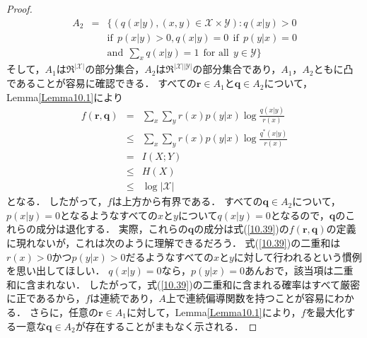 \documentclass{ltjsarticle}
\theoremstyle{definition}
\begin{document}
\begin{proof}
\begin{eqnarray}
    A_2 &=& \{ \left( q(x|y), (x,y) \in \mathcal{X} \times \mathcal{Y} \right) : q(x|y) > 0 \nonumber \\
    && \mbox{if} \ \  p(x|y) > 0, q(x|y) = 0 \ \ \mbox{if} \ \ p(y|x) = 0 \nonumber \\
    && \mbox{and} \ \ \sum_{x} q(x|y) = 1 \ \ \mbox{for all} \ \ y \in \mathcal{Y} \}
  \end{eqnarray}
  そして，$A_1$は$\mathfrak{R}^{| \mathcal{X} |}$の部分集合，$A_2$は$\mathfrak{R}^{|\mathcal{X}| |\mathcal{Y}|}$の部分集合であり，$A_1$，$A_2$ともに凸であることが容易に確認できる．
  すべての$\mathbf{r} \in A_1$と$\mathbf{q} \in A_2$について，Lemma\ref{Lemma10.1}により
  \begin{eqnarray}
    \label{10.42}
    f(\mathbf{r}, \mathbf{q}) &=& \sum_{x} \sum_{y} r(x) p(y|x) \log \frac{q(x|y)}{r(x)} \\
    \label{10.43}
    &\leq& \sum_{x} \sum_{y} r(x) p(y|x) \log \frac{q^*(x|y)}{r(x)} \\
    \label{10.44}
    &=& I(X;Y) \\
    \label{10.45}
    &\leq& H(X) \\
    \label{10.46}
    &\leq& \log | \mathcal{X} |
  \end{eqnarray}
  となる．
  したがって，$f$は上方から有界である．
  すべての$\mathbf{q} \in A_2$について，$p(x|y)=0$となるようなすべての$x$と$y$について$q(x|y)=0$となるので，$\mathbf{q}$のこれらの成分は退化する．
  実際，これらの$\mathbf{q}$の成分は式(\ref{10.39})の$f(\mathbf{r}, \mathbf{q})$の定義に現れないが，これは次のように理解できるだろう．
  式(\ref{10.39})の二重和は$r(x)>0$かつ$p(y|x)>0$だるようなすべての$x$と$y$に対して行われるという慣例を思い出してほしい．
  $q(x|y)=0$なら，$p(y|x)=0$あんおで，該当項は二重和に含まれない．
  したがって，式(\ref{10.39})の二重和に含まれる確率はすべて厳密に正であるから，$f$は連続であり，$A$上で連続偏導関数を持つことが容易にわかる．
  さらに，任意の$\mathbf{r} \in A_1$に対して，Lemma\ref{Lemma10.1}により，$f$を最大化する一意な$\mathbf{q} \in A_2$が存在することがまもなく示される．


\end{proof}
\end{document}
